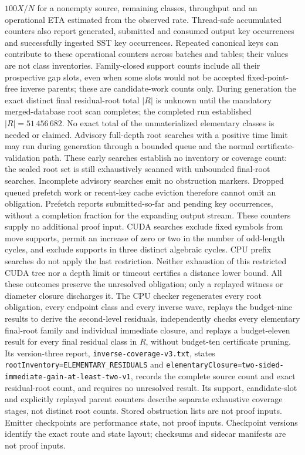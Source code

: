 \documentclass[11pt,a4paper]{article}
\begin{document}
$100X/N$ for a nonempty source, remaining classes, throughput and an
operational ETA estimated from the observed rate. Thread-safe accumulated
counters also report generated, submitted and consumed output key occurrences
and successfully ingested SST key occurrences. Repeated canonical keys can
contribute to these operational counters across batches and tables; their
values are not class inventories. Family-closed support counts include all
their prospective gap slots, even when some slots would not be accepted
fixed-point-free inverse parents; these are candidate-work counts only.
During generation the exact distinct final residual-root total $|R|$ is unknown
until the mandatory merged-database root scan completes; the completed run
established $|R|=51\,456\,682$. No exact total of the
unmaterialized elementary classes is needed or claimed.
Advisory full-depth root searches with a positive time limit may run during
generation through a
bounded queue and the normal certificate-validation path. These early
searches establish no inventory or coverage count: the sealed root set is
still exhaustively scanned with unbounded final-root searches. Incomplete
advisory searches emit no obstruction markers. Dropped queued prefetch work or recent-key
cache eviction therefore cannot omit an obligation.
Prefetch reports submitted-so-far and pending key occurrences, without a
completion fraction for the expanding output stream. These counters supply
no additional proof input.
CUDA searches exclude fixed symbols from move supports, permit an increase of
zero or two in the number of odd-length cycles, and exclude supports in three
distinct algebraic cycles. CPU prefix searches do not apply the last
restriction. Neither exhaustion of this restricted CUDA tree nor a depth limit
or timeout certifies a distance lower bound. All these outcomes preserve the unresolved
obligation; only a replayed witness or diameter closure discharges it.
The CPU checker regenerates every
root obligation, every endpoint class and every inverse wave, replays the
budget-nine results to derive the second-level residuals, independently
checks every elementary final-root family and individual immediate closure,
and replays a budget-eleven result for every final residual class in $R$,
without budget-ten certificate pruning. Its version-three report,
\nolinkurl{inverse-coverage-v3.txt}, states
\nolinkurl{rootInventory=ELEMENTARY_RESIDUALS} and
\nolinkurl{elementaryClosure=two-sided-immediate-gain-at-least-two-v1},
records the complete source count and exact residual-root count, and requires
no unresolved result. Its support, candidate-slot and explicitly replayed
parent counters describe separate exhaustive coverage stages, not distinct
root counts.
Stored obstruction lists are not proof inputs. Emitter checkpoints are performance
state, not proof inputs. Checkpoint versions identify the exact route and state layout; checksums and sidecar manifests are not proof inputs.
\end{document}
